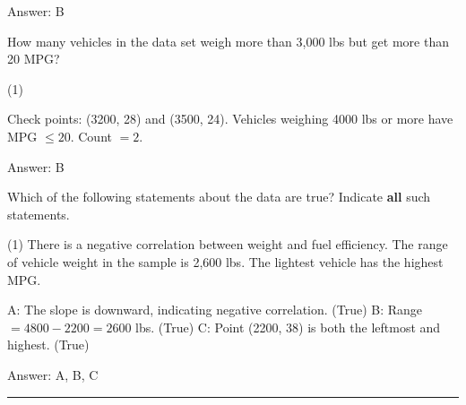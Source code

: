 \documentclass[11pt,paper=a4,answers]{exam}
\begin{document}
\begin{questions}
\begin{solution}
Answer: \colorbox{yellow!100}{B}
\end{solution}

\vspace{1cm}

\question
How many vehicles in the data set weigh more than 3,000 lbs but get more than 20 MPG?

\begin{tasks}(1)
    
\end{tasks}

\begin{solution}
\begin{center}
Check points: (3200, 28) and (3500, 24).
\vspace{5pt}
Vehicles weighing 4000 lbs or more have MPG $\leq 20$.
\vspace{5pt}
Count $= 2$.
\end{center}

Answer: \colorbox{yellow!100}{B}
\end{solution}

\vspace{1cm}

\question
Which of the following statements about the data are true?
Indicate \textbf{all} such statements.

\begin{tasks}(1)
\task[A)] There is a negative correlation between weight and fuel efficiency.
\task[B)] The range of vehicle weight in the sample is 2,600 lbs.
\task[C)] The lightest vehicle has the highest MPG.
\end{tasks}

\begin{solution}
\begin{center}
A: The slope is downward, indicating negative correlation. (True)
\vspace{5pt}
B: Range $= 4800 - 2200 = 2600$ lbs. (True)
\vspace{5pt}
C: Point (2200, 38) is both the leftmost and highest. (True)
\end{center}

Answer: \colorbox{yellow!100}{A, B, C}
\end{solution}


\end{questions}
\begin{center}
\rule{.5\textwidth}{1pt}
\end{center}
\end{document}
